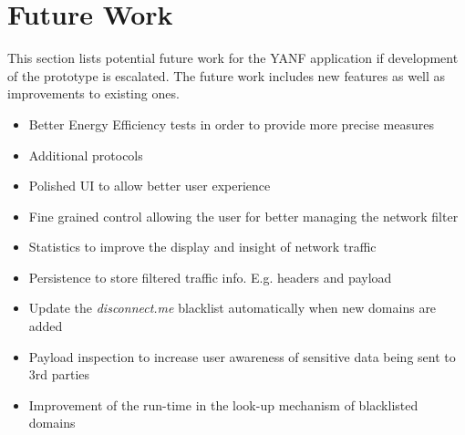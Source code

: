 \documentclass[main.tex]{subfiles}
\begin{document}
\section{Future Work}
\label{sec:futureWork}

This section lists potential future work for the YANF application if development of the prototype is escalated. The future work includes new features as well as improvements to existing ones.

\begin{itemize}
    \item Better Energy Efficiency tests in order to provide more precise measures
    \item Additional protocols
    \item Polished UI to allow better user experience
    \item Fine grained control allowing the user for better managing the network filter
    \item Statistics to improve the display and insight of network traffic
    \item Persistence to store filtered traffic info. E.g. headers and payload
    \item Update the \textit{disconnect.me} blacklist automatically when new domains are added
    \item Payload inspection to increase user awareness of sensitive data being sent to 3rd parties
    \item Improvement of the run-time in the look-up mechanism of blacklisted domains
\end{itemize}






\end{document}
